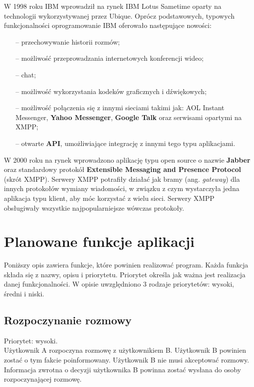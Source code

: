 \documentclass[a4paper,12pt]{article}
\begin{document}
\par W 1998 roku IBM wprowadził na rynek IBM Lotus Sametime oparty na technologii wykorzystywanej przez Ubique. Oprócz podstawowych, typowych funkcjonalności oprogramowanie IBM oferowało następujące nowości:
\begin{itemize}
    \item[--] przechowywanie historii rozmów;
    \item[--] możliwość przeprowadzania internetowych konferencji wideo;
    \item[--] chat;
    \item[--] możliwość wykorzystania kodeków graficznych i dźwiękowych;
    \item[--] możliwość połączenia się z innymi sieciami takimi jak: AOL Instant Messenger, \textbf{Yahoo Messenger}, \textbf{Google Talk} oraz serwisami opartymi na XMPP;
    \item[--] otwarte \textbf{API}, umożliwiające integrację z innymi tego typu aplikacjami.
\end{itemize}

W 2000 roku na rynek wprowadzono aplikację typu open source o nazwie \textbf{Jabber} oraz standardowy protokół \textbf{Extensible Messaging and Presence Protocol} (skrót XMPP). Serwery XMPP potrafiły działać jak bramy (ang. \textit{gateway}) dla innych protokołów wymiany wiadomości, w związku z czym wystarczyła jedna aplikacja typu klient, aby móc korzystać z wielu sieci. Serwery XMPP obsługiwały wszystkie najpopularniejsze wówczas protokoły.



\section[Planowane funkcje aplikacji]{Planowane funkcje aplikacji}

Poniższy opis zawiera funkcje, które powinien realizować program. Każda funkcja składa się z nazwy, opisu i priorytetu. Priorytet określa jak ważna jest realizacja danej funkcjonalności. W opisie uwzględniono 3 rodzaje priorytetów: wysoki, średni i niski.
\subsection[Rozpoczynanie rozmowy]{Rozpoczynanie rozmowy}
Priorytet: wysoki.\\

Użytkownik A rozpoczyna rozmowę z użytkownikiem B. Użytkownik B powinien zostać o tym fakcie poinformowany. Użytkownik B nie musi akceptować rozmowy. Informacja zwrotna o decyzji użytkownika B powinna zostać wysłana do osoby rozpoczynającej rozmowę.
\end{document}
